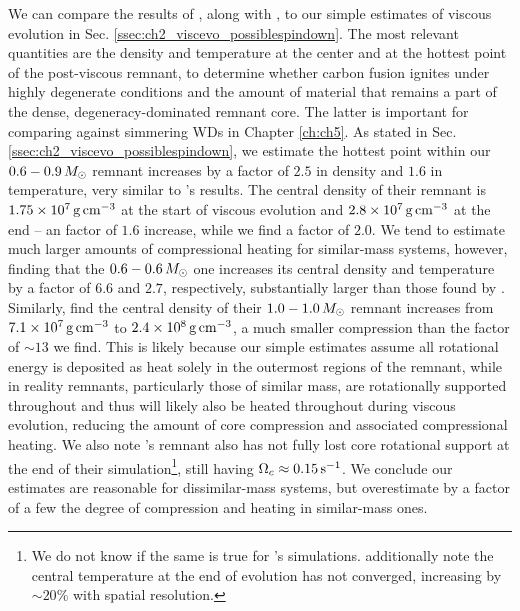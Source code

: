 
We can compare the results of \cite{ji+13}, along with \cite{schw+12}, to our simple estimates of viscous evolution in Sec. \ref{ssec:ch2_viscevo_possiblespindown}.  The most relevant quantities are the density and temperature at the center and at the hottest point of the post-viscous remnant, to determine whether carbon fusion ignites under highly degenerate conditions and the amount of material that remains a part of the dense, degeneracy-dominated remnant core.  The latter is important for comparing against simmering WDs in Chapter \ref{ch:ch5}.  As stated in Sec. \ref{ssec:ch2_viscevo_possiblespindown}, we estimate the hottest point within our $0.6-0.9\,\Msun$ remnant increases by a factor of $2.5$ in density and $1.6$ in temperature, very similar to \cite{schw+12}'s results.  The central density of their remnant is $1.75\times10^7\,\gcc$ at the start of viscous evolution \citep{dan+11} and $2.8\times10^7\,\gcc$ at the end -- an factor of $1.6$ increase, while we find a factor of $2.0$.  We tend to estimate much larger amounts of compressional heating for similar-mass systems, however, finding that the $0.6 - 0.6\,\Msun$ one increases its central density and temperature by a factor of $6.6$ and $2.7$, respectively, substantially larger than those found by \cite{ji+13}.  Similarly, \cite{rask+14} find the central density of their $1.0-1.0\,\Msun$ remnant increases from $7.1\times10^7\,\gcc$ to $2.4\times10^8\,\gcc$, a much smaller compression than the factor of $\sim13$ we find.  This is likely because our simple estimates assume all rotational energy is deposited as heat solely in the outermost regions of the remnant, while in reality remnants, particularly those of similar mass, are rotationally supported throughout and thus will likely also be heated throughout during viscous evolution, reducing the amount of core compression and associated compressional heating.  We also note \cite{ji+13}'s remnant also has not fully lost core rotational support at the end of their simulation\footnote{We do not know if the same is true for \cite{rask+14}'s simulations.  \cite{ji+13} additionally note the central temperature at the end of evolution has not converged, increasing by $\sim20$\% with spatial resolution.}, still having $\Omegac \approx 0.15\,\psec$.  We conclude our estimates are reasonable for dissimilar-mass systems, but overestimate by a factor of a few the degree of compression and heating in similar-mass ones.

